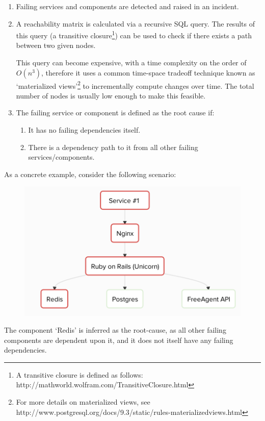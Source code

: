 \documentclass{cshonours}
\begin{document}
\begin{enumerate}
  \item Failing services and components are detected and raised in an incident.
  \item A reachability matrix is calculated via a recursive SQL query. The results of this query (a transitive closure\footnote{A transitive closure is defined as follows: http://mathworld.wolfram.com/TransitiveClosure.html}) can be used to check if there exists a path between two given nodes.

    This query can become expensive, with a time complexity on the order of $O(n^3)$, therefore it uses a common time-space tradeoff technique known as `materialized views'\footnote{For more details on materialized views, see http://www.postgresql.org/docs/9.3/static/rules-materializedviews.html} to incrementally compute changes over time. The total number of nodes is usually low enough to make this feasible.
  \item The failing service or component is defined as the root cause if:
    \begin{enumerate}
      \item It has no failing dependencies itself.
      \item There is a dependency path to it from all other failing services/components.
    \end{enumerate}
\end{enumerate}

As a concrete example, consider the following scenario:

\begin{figure}[!htbp]
  \centering
  \includegraphics[scale=0.7]{web-ui/rca.png}
\end{figure}

The component `Redis' is inferred as the root-cause, as all other failing components are dependent upon it, and it does not itself have any failing dependencies.
\end{document}
